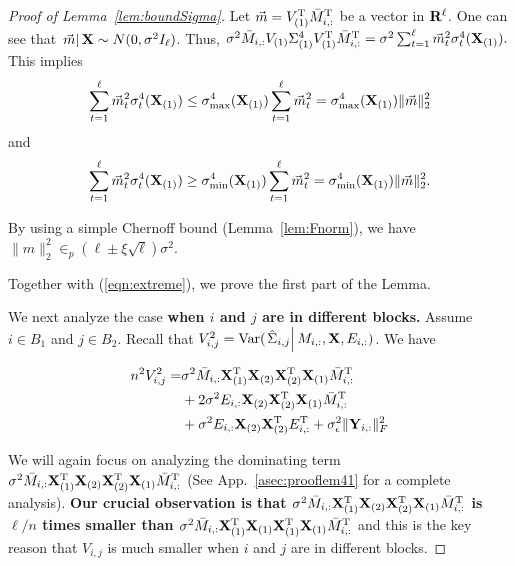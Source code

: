 \begin{proof}[Proof of Lemma~\ref{lem:boundSigma}]
Let $\vec m = V^{\mathrm{T}}_{(1)}\bar M^{\mathrm{T}}_{i,:}$ be a vector in $\mathbf{R}^{\ell}$. One can see that $\left. \vec m  \right| \mathbf{X} \sim N(0, \sigma^2 I_{\ell})$. Thus, $\sigma^2\bar M_{i,:}V_{(1)}\Sigma^4_{(1)}V^{\mathrm{T}}_{(1)}\bar M^{\mathrm{T}}_{i,:}
    =\sigma^2 \sum^{\ell}_{t = 1}\vec m^2_{t}\sigma^4_{t}(\mathbf{X}_{(1)}).$  This implies
{\small
\begin{equation}
        \sum^{\ell}_{t = 1}\vec m^2_{t}\sigma^4_{t}(\mathbf{X}_{(1)})
        \leq \sigma^4_{\max}(\mathbf{X}_{(1)})\sum^{\ell}_{t = 1}\vec m^2_{t} 
         = \sigma^4_{\max}(\mathbf{X}_{(1)})\| \vec m\|^2_2
\end{equation}
}
and  
\begin{equation}
        \sum^{\ell}_{t = 1}\vec m^2_{t}\sigma^4_{t}(\mathbf{X}_{(1)})
         \geq \sigma^4_{\min}(\mathbf{X}_{(1)})\sum^{\ell}_{t = 1}\vec m^2_{t}  = \sigma^4_{\min}(\mathbf{X}_{(1)})\|\vec m\|^2_2.
\end{equation}

 
By using a simple Chernoff bound (Lemma~\ref{lem:Fnorm}), we have $\|m\|^2_2 \in_p (\ell \pm \xi \sqrt{\ell})\sigma^2$.

Together with (\ref{eqn:extreme}),  we prove the first part of the Lemma.
\fi

We next analyze the case \textbf{when $i$ and $j$ are in different blocks.} Assume $i \in B_1$ and $j \in B_2$. Recall that $V^2_{i,j} = \mathrm{Var}(\left. \hat{\Sigma}_{i,j} \right| M_{i,:},\mathbf{X},E_{i,:} )$. We have

\begin{equation}
\begin{split}
    n^2 V^2_{i,j} 
    =&  \sigma^2 \bar M_{i, :}\mathbf{X}_{(1)}^{\mathrm{T}}\mathbf{X}_{(2)}\mathbf{X}_{(2)}^{\mathrm{T}}\mathbf{X}_{(1)}\bar M^{\mathrm{T}}_{i, :}   \\
    &+ 2\sigma^2E_{i,:}\mathbf{X}_{(2)}\mathbf{X}^{\mathrm{T}}_{(2)}\mathbf{X}_{(1)}\bar M^{\mathrm{T}}_{i,:}  \\
    &+\sigma^2 E_{i,:}\mathbf{X}_{(2)} \mathbf{X}_{(2)}^{\mathrm{T}} E^{\mathrm{T}}_{i,:} + \sigma^2_{\epsilon}\|\mathbf{Y}_{i,:}\|^2_F 
\end{split}
\end{equation}

We will again focus on analyzing the dominating term $\sigma^2 \bar M_{i, :}\mathbf{X}_{(1)}^{\mathrm{T}}\mathbf{X}_{(2)}\mathbf{X}_{(2)}^{\mathrm{T}}\mathbf{X}_{(1)}\bar M^{\mathrm{T}}_{i, :}$ (See App.~\ref{asec:prooflem41} for a complete analysis). \textbf{Our crucial observation is that $\sigma^2 \bar M_{i, :}\mathbf{X}_{(1)}^{\mathrm{T}}\mathbf{X}_{(2)}\mathbf{X}_{(2)}^{\mathrm{T}}\mathbf{X}_{(1)}\bar M^{\mathrm{T}}_{i, :}$ is $\ell/n$ times smaller than $\sigma^2 \bar M_{i, :}\mathbf{X}_{(1)}^{\mathrm{T}}\mathbf{X}_{(1)}\mathbf{X}_{(1)}^{\mathrm{T}}\mathbf{X}_{(1)}\bar M^{\mathrm{T}}_{i, :}$} and this is the key reason that $V_{i,j}$ is much smaller when $i$ and $j$ are in different blocks. 


\end{proof}
